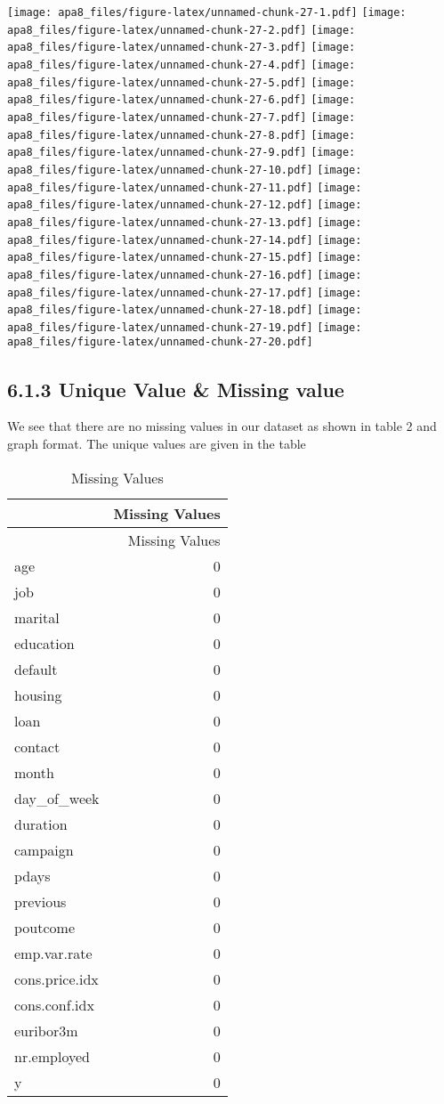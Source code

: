 \documentclass[english,floatsintext,man]{apa6}
\begin{document}
\texttt{[image: apa8\_files/figure-latex/unnamed-chunk-27-1.pdf]}
\texttt{[image: apa8\_files/figure-latex/unnamed-chunk-27-2.pdf]}
\texttt{[image: apa8\_files/figure-latex/unnamed-chunk-27-3.pdf]}
\texttt{[image: apa8\_files/figure-latex/unnamed-chunk-27-4.pdf]}
\texttt{[image: apa8\_files/figure-latex/unnamed-chunk-27-5.pdf]}
\texttt{[image: apa8\_files/figure-latex/unnamed-chunk-27-6.pdf]}
\texttt{[image: apa8\_files/figure-latex/unnamed-chunk-27-7.pdf]}
\texttt{[image: apa8\_files/figure-latex/unnamed-chunk-27-8.pdf]}
\texttt{[image: apa8\_files/figure-latex/unnamed-chunk-27-9.pdf]}
\texttt{[image: apa8\_files/figure-latex/unnamed-chunk-27-10.pdf]}
\texttt{[image: apa8\_files/figure-latex/unnamed-chunk-27-11.pdf]}
\texttt{[image: apa8\_files/figure-latex/unnamed-chunk-27-12.pdf]}
\texttt{[image: apa8\_files/figure-latex/unnamed-chunk-27-13.pdf]}
\texttt{[image: apa8\_files/figure-latex/unnamed-chunk-27-14.pdf]}
\texttt{[image: apa8\_files/figure-latex/unnamed-chunk-27-15.pdf]}
\texttt{[image: apa8\_files/figure-latex/unnamed-chunk-27-16.pdf]}
\texttt{[image: apa8\_files/figure-latex/unnamed-chunk-27-17.pdf]}
\texttt{[image: apa8\_files/figure-latex/unnamed-chunk-27-18.pdf]}
\texttt{[image: apa8\_files/figure-latex/unnamed-chunk-27-19.pdf]}
\texttt{[image: apa8\_files/figure-latex/unnamed-chunk-27-20.pdf]}

\subsection{6.1.3 Unique Value \& Missing
value}\label{unique-value-missing-value}

We see that there are no missing values in our dataset as shown in table
2 and graph format. The unique values are given in the table

\begin{longtable}[c]{@{}lr@{}}
\caption{Missing Values}\tabularnewline
\toprule
& Missing Values\tabularnewline
\midrule
\endfirsthead
\toprule
& Missing Values\tabularnewline
\midrule
\endhead
age & 0\tabularnewline
job & 0\tabularnewline
marital & 0\tabularnewline
education & 0\tabularnewline
default & 0\tabularnewline
housing & 0\tabularnewline
loan & 0\tabularnewline
contact & 0\tabularnewline
month & 0\tabularnewline
day\_of\_week & 0\tabularnewline
duration & 0\tabularnewline
campaign & 0\tabularnewline
pdays & 0\tabularnewline
previous & 0\tabularnewline
poutcome & 0\tabularnewline
emp.var.rate & 0\tabularnewline
cons.price.idx & 0\tabularnewline
cons.conf.idx & 0\tabularnewline
euribor3m & 0\tabularnewline
nr.employed & 0\tabularnewline
y & 0\tabularnewline
\bottomrule
\end{longtable}
\end{document}
